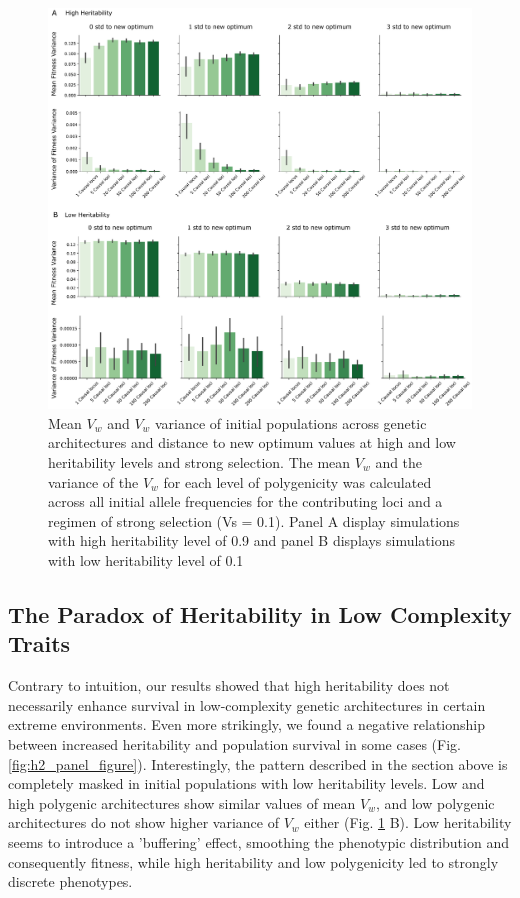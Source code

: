 \documentclass{article}
\begin{document}
\begin{figure}[H]
    \centering
    \includegraphics[width=1\textwidth]{figures/mean_var_of_fitness_var_ipop_sel0.1.pdf}
    \caption{Mean $V_w$ and $V_w$ variance of initial populations across genetic architectures and distance to new optimum values at high and low heritability levels and strong selection. The mean $V_w$ and the variance of the $V_w$ for each level of polygenicity was calculated across all initial allele frequencies for the contributing loci and a regimen of strong selection (Vs = 0.1). Panel A display simulations with high heritability level of 0.9 and panel B displays simulations with low heritability level of 0.1}
    \label{fig:initial_pop_meanandvar_fitvar}
\end{figure}

\subsection{The Paradox of Heritability in Low Complexity Traits}
Contrary to intuition, our results showed that high heritability does not necessarily enhance survival in low-complexity genetic architectures in certain extreme environments. Even more strikingly, we found a negative relationship between increased heritability and population survival in some cases (Fig. \ref{fig:h2_panel_figure}). Interestingly, the pattern described in the section above is completely masked in initial populations with low heritability levels. Low and high polygenic architectures show similar values of mean $V_w$, and low polygenic architectures do not show higher variance of $V_w$ either (Fig. \ref{fig:initial_pop_meanandvar_fitvar} B). Low heritability seems to introduce a 'buffering' effect, smoothing the phenotypic distribution and consequently fitness, while high heritability and low polygenicity led to strongly discrete phenotypes. 
\end{document}

